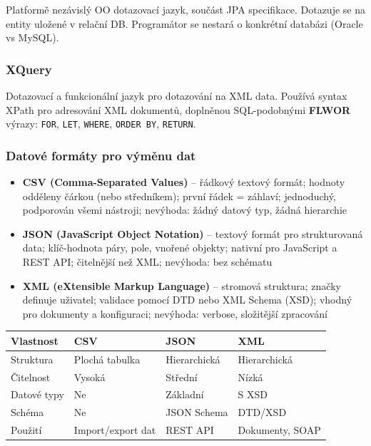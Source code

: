 Platformě nezávislý OO dotazovací jazyk, součást JPA specifikace. Dotazuje se na entity uložené
v relační DB. Programátor se nestará o konkrétní databázi (Oracle vs MySQL).

\subsubsection{XQuery}

Dotazovací a funkcionální jazyk pro dotazování na XML data. Používá syntax XPath pro adresování
XML dokumentů, doplněnou SQL-podobnými \textbf{FLWOR} výrazy:
\texttt{FOR}, \texttt{LET}, \texttt{WHERE}, \texttt{ORDER BY}, \texttt{RETURN}.

\subsubsection{Datové formáty pro výměnu dat}

\begin{itemize}
  \item \textbf{CSV (Comma-Separated Values)} -- řádkový textový formát; hodnoty odděleny čárkou (nebo středníkem);
    první řádek = záhlaví; jednoduchý, podporován všemi nástroji; nevýhoda: žádný datový typ, žádná hierarchie
  \item \textbf{JSON (JavaScript Object Notation)} -- textový formát pro strukturovaná data; klíč-hodnota páry,
    pole, vnořené objekty; nativní pro JavaScript a REST API; čitelnější než XML; nevýhoda: bez schématu
  \item \textbf{XML (eXtensible Markup Language)} -- stromová struktura; značky definuje uživatel; validace pomocí
    DTD nebo XML Schema (XSD); vhodný pro dokumenty a konfiguraci; nevýhoda: verbose, složitější zpracování
\end{itemize}

\begin{center}
\begin{tabular}{llll}
\toprule
\textbf{Vlastnost} & \textbf{CSV} & \textbf{JSON} & \textbf{XML} \\
\midrule
Struktura & Plochá tabulka & Hierarchická & Hierarchická \\
Čitelnost & Vysoká & Střední & Nízká \\
Datové typy & Ne & Základní & S XSD \\
Schéma & Ne & JSON Schema & DTD/XSD \\
Použití & Import/export dat & REST API & Dokumenty, SOAP \\
\bottomrule
\end{tabular}
\end{center}

